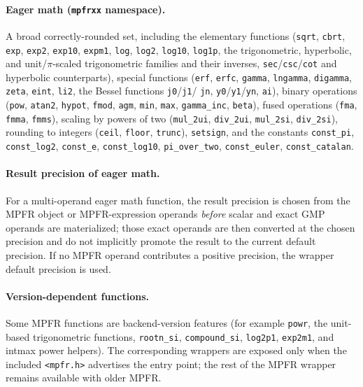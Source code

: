 \documentclass[11pt,a4paper]{article}
\newcommand{\code}[1]{\lstinline!#1!}
\begin{document}
\paragraph{Eager math (\code{mpfrxx} namespace).}
A broad correctly-rounded set, including the elementary functions
(\code{sqrt}, \code{cbrt}, \code{exp}, \code{exp2}, \code{exp10}, \code{expm1},
\code{log}, \code{log2}, \code{log10}, \code{log1p}, the trigonometric,
hyperbolic, and unit/$\pi$-scaled trigonometric families and their inverses,
\code{sec}/\code{csc}/\code{cot} and hyperbolic counterparts), special functions
(\code{erf}, \code{erfc}, \code{gamma}, \code{lngamma}, \code{digamma},
\code{zeta}, \code{eint}, \code{li2}, the Bessel functions \code{j0}/\code{j1}/
\code{jn}, \code{y0}/\code{y1}/\code{yn}, \code{ai}), binary operations
(\code{pow}, \code{atan2}, \code{hypot}, \code{fmod}, \code{agm}, \code{min},
\code{max}, \code{gamma_inc}, \code{beta}), fused operations (\code{fma},
\code{fmma}, \code{fmms}), scaling by powers of two (\code{mul_2ui},
\code{div_2ui}, \code{mul_2si}, \code{div_2si}), rounding to integers
(\code{ceil}, \code{floor}, \code{trunc}), \code{setsign}, and the constants
\code{const_pi}, \code{const_log2}, \code{const_e}, \code{const_log10},
\code{pi_over_two}, \code{const_euler}, \code{const_catalan}.

\paragraph{Result precision of eager math.}
For a multi-operand eager math function, the result precision is chosen from the
MPFR object or MPFR-expression operands \emph{before} scalar and exact GMP
operands are materialized; those exact operands are then converted at the chosen
precision and do not implicitly promote the result to the current default
precision. If no MPFR operand contributes a positive precision, the wrapper
default precision is used.

\paragraph{Version-dependent functions.}
Some MPFR functions are backend-version features (for example \code{powr}, the
unit-based trigonometric functions, \code{rootn_si}, \code{compound_si},
\code{log2p1}, \code{exp2m1}, and intmax power helpers). The corresponding
wrappers are exposed only when the included \code{<mpfr.h>} advertises the entry
point; the rest of the MPFR wrapper remains available with older MPFR.
\end{document}
